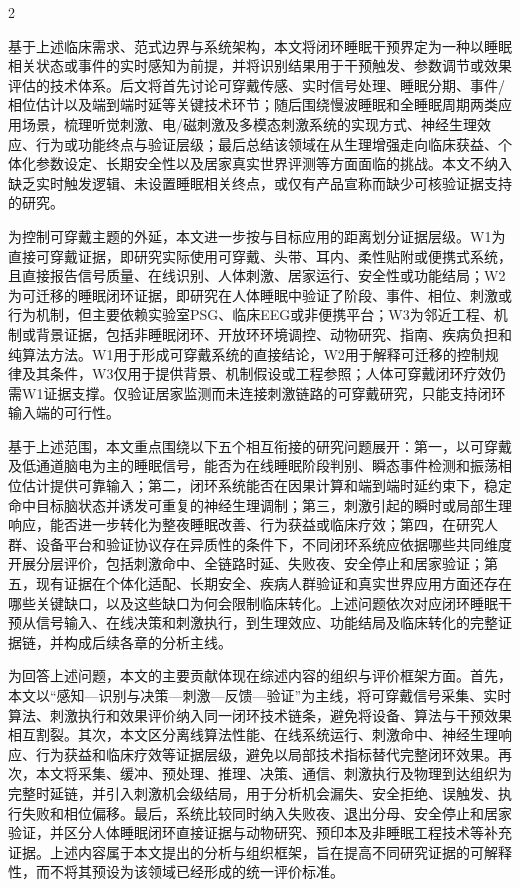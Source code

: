 \documentclass[UTF8,zihao=5,fontset=none]{ctexart}
\newcommand{\hei}{\CJKfamily{hei}}
\newcommand{\leveltwo}[1]{%
  \par\noindent{\hei\fontsize{10.5pt}{12.6pt}\selectfont\mdseries #1\par}}
\begin{document}
\begin{multicols}{2}
\leveltwo{1.4 本文综述范围与结构安排}

基于上述临床需求、范式边界与系统架构，本文将闭环睡眠干预界定为一种以睡眠相关状态或事件的实时感知为前提，并将识别结果用于干预触发、参数调节或效果评估的技术体系。后文将首先讨论可穿戴传感、实时信号处理、睡眠分期、事件/相位估计以及端到端时延等关键技术环节；随后围绕慢波睡眠和全睡眠周期两类应用场景，梳理听觉刺激、电/磁刺激及多模态刺激系统的实现方式、神经生理效应、行为或功能终点与验证层级；最后总结该领域在从生理增强走向临床获益、个体化参数设定、长期安全性以及居家真实世界评测等方面面临的挑战。本文不纳入缺乏实时触发逻辑、未设置睡眠相关终点，或仅有产品宣称而缺少可核验证据支持的研究。

为控制可穿戴主题的外延，本文进一步按与目标应用的距离划分证据层级。W1为直接可穿戴证据，即研究实际使用可穿戴、头带、耳内、柔性贴附或便携式系统，且直接报告信号质量、在线识别、人体刺激、居家运行、安全性或功能结局；W2为可迁移的睡眠闭环证据，即研究在人体睡眠中验证了阶段、事件、相位、刺激或行为机制，但主要依赖实验室PSG、临床EEG或非便携平台；W3为邻近工程、机制或背景证据，包括非睡眠闭环、开放环环境调控、动物研究、指南、疾病负担和纯算法方法。W1用于形成可穿戴系统的直接结论，W2用于解释可迁移的控制规律及其条件，W3仅用于提供背景、机制假设或工程参照；人体可穿戴闭环疗效仍需W1证据支撑。仅验证居家监测而未连接刺激链路的可穿戴研究，只能支持闭环输入端的可行性。

基于上述范围，本文重点围绕以下五个相互衔接的研究问题展开：第一，以可穿戴及低通道脑电为主的睡眠信号，能否为在线睡眠阶段判别、瞬态事件检测和振荡相位估计提供可靠输入；第二，闭环系统能否在因果计算和端到端时延约束下，稳定命中目标脑状态并诱发可重复的神经生理调制；第三，刺激引起的瞬时或局部生理响应，能否进一步转化为整夜睡眠改善、行为获益或临床疗效；第四，在研究人群、设备平台和验证协议存在异质性的条件下，不同闭环系统应依据哪些共同维度开展分层评价，包括刺激命中、全链路时延、失败夜、安全停止和居家验证；第五，现有证据在个体化适配、长期安全、疾病人群验证和真实世界应用方面还存在哪些关键缺口，以及这些缺口为何会限制临床转化。上述问题依次对应闭环睡眠干预从信号输入、在线决策和刺激执行，到生理效应、功能结局及临床转化的完整证据链，并构成后续各章的分析主线。\par

为回答上述问题，本文的主要贡献体现在综述内容的组织与评价框架方面。首先，本文以“感知—识别与决策—刺激—反馈—验证”为主线，将可穿戴信号采集、实时算法、刺激执行和效果评价纳入同一闭环技术链条，避免将设备、算法与干预效果相互割裂。其次，本文区分离线算法性能、在线系统运行、刺激命中、神经生理响应、行为获益和临床疗效等证据层级，避免以局部技术指标替代完整闭环效果。再次，本文将采集、缓冲、预处理、推理、决策、通信、刺激执行及物理到达组织为完整时延链，并引入刺激机会级结局，用于分析机会漏失、安全拒绝、误触发、执行失败和相位偏移。最后，系统比较同时纳入失败夜、退出分母、安全停止和居家验证，并区分人体睡眠闭环直接证据与动物研究、预印本及非睡眠工程技术等补充证据。上述内容属于本文提出的分析与组织框架，旨在提高不同研究证据的可解释性，而不将其预设为该领域已经形成的统一评价标准。\par

\end{multicols}
\end{document}
